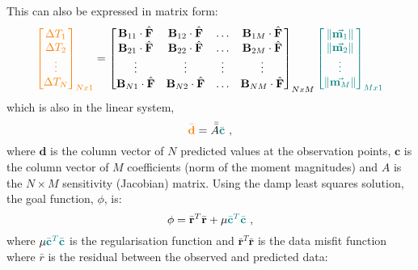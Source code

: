 This can also be expressed in matrix form:
\begin{equation}
\textcolor{orange}{\begin{bmatrix}
    \Delta T_1 \\ \Delta T_2 \\ \vdots \\ \Delta T_N
\end{bmatrix}_{Nx1}} = \begin{bmatrix}
    \mathbf{B}_{11} \cdot \hat{\mathbf{F}} & \mathbf{B}_{12} \cdot \hat{\mathbf{F}} & \hdots & \mathbf{B}_{1M} \cdot \hat{\mathbf{F}} \\
    \mathbf{B}_{21} \cdot \hat{\mathbf{F}} & \mathbf{B}_{22} \cdot \hat{\mathbf{F}} & \hdots & \mathbf{B}_{2M} \cdot \hat{\mathbf{F}} \\
    \vdots & \vdots & \vdots & \vdots \\
    \mathbf{B}_{N1} \cdot \hat{\mathbf{F}} & \mathbf{B}_{N2} \cdot \hat{\mathbf{F}} & \hdots & \mathbf{B}_{NM} \cdot \hat{\mathbf{F}} \\
\end{bmatrix}_{NxM} \textcolor{teal}{\begin{bmatrix}
    \left\lVert \vec{\mathbf{m}_1} \right\rVert \\ \left\lVert \vec{\mathbf{m}_2} \right\rVert \\ \vdots \\ \left\lVert \vec{\mathbf{m}_M} \right\rVert
\end{bmatrix}_{Mx1}}
\end{equation}
which is also in the linear system,
\begin{equation}
    \textcolor{orange}{\bar{\mathbf{d}}} = \bar{\bar{A}} \textcolor{teal}{\bar{\mathbf{c}}}
    \ ,
\end{equation}
where $\mathbf{d}$ is the column vector of $N$ predicted values at the observation points, $\mathbf{c}$ is the column vector of $M$ coefficients (norm of the moment magnitudes) and $A$ is the $N \times M$ sensitivity (Jacobian) matrix. Using the damp least squares solution, the goal function, $\phi$, is:
\begin{equation}
\label{'eq:goal function'}
    \phi = \bar{\mathbf{r}}^T\bar{\mathbf{r}} + \mu \textcolor{teal}{\bar{\mathbf{c}}^T\bar{\mathbf{c}}}
    \ ,
\end{equation}
where $\mu \textcolor{teal}{\bar{\mathbf{c}}^T\bar{\mathbf{c}}}$ is the regularisation function and  $\bar{\mathbf{r}}^T\bar{\mathbf{r}}$ is the data misfit function where $\bar{r}$ is the residual between the observed and predicted data:

